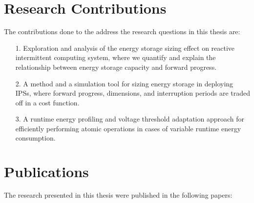 \begin{enumerate}
  
\end{enumerate}

\section{Research Contributions}



The contributions done to the address the research questions in this thesis are:
\begin{itemize}
  \item[1.] Exploration and analysis of the energy storage sizing effect on reactive intermittent computing system, where we quantify and explain the relationship between energy storage capacity and forward progress.
  \item[2.] A method and a simulation tool for sizing energy storage in deploying IPSs, where forward progress, dimensions, and interruption periods are traded off in a cost function.
  \item[3.] A runtime energy profiling and voltage threshold adaptation approach for efficiently performing atomic operations in cases of variable runtime energy consumption. 
\end{itemize}


\section{Publications}

The research presented in this thesis were published in the following papers:

